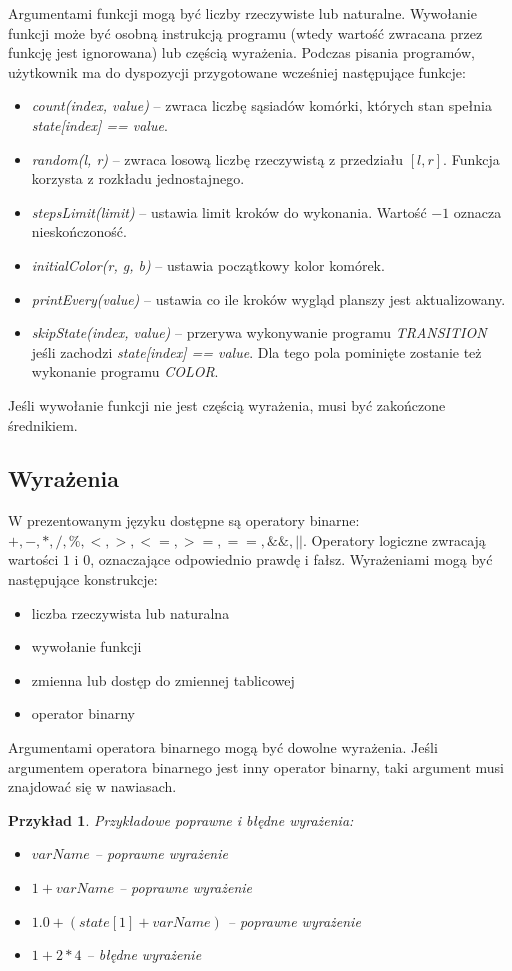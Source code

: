 \documentclass[declaration,shortabstract, inz]{iithesis}
\theoremstyle{definition} \newtheorem{definition}{Definicja}[]
\theoremstyle{plain} \newtheorem{remark}[definition]{Obserwacja}
\theoremstyle{plain} \newtheorem{theorem}[definition]{Twierdzenie}
\theoremstyle{plain} \newtheorem{example}{Przykład}[definition]
\theoremstyle{plain} \newtheorem{lemma}[definition]{Lemat}
\begin{document}
Argumentami funkcji mogą być liczby rzeczywiste lub naturalne. Wywołanie funkcji może być osobną instrukcją programu (wtedy wartość zwracana przez funkcję jest ignorowana) lub częścią wyrażenia.
Podczas pisania programów, użytkownik ma do dyspozycji przygotowane wcześniej następujące funkcje:
\begin{itemize}
\item \textit{count(index, value)} -- zwraca liczbę sąsiadów komórki, których stan spełnia \textit{state[index] == value}.
\item \textit{random(l, r)} -- zwraca losową liczbę rzeczywistą z przedziału $[l, r]$. Funkcja korzysta z rozkładu jednostajnego.
\item \textit{stepsLimit(limit)} -- ustawia limit kroków do wykonania. Wartość $-1$ oznacza nieskończoność.
\item \textit{initialColor(r, g, b)} -- ustawia początkowy kolor komórek.
\item \textit{printEvery(value)} -- ustawia co ile kroków wygląd planszy jest aktualizowany.
\item \textit{skipState(index, value)} -- przerywa wykonywanie programu \textit{TRANSITION} jeśli zachodzi \textit{state[index] == value}. Dla tego pola pominięte zostanie też wykonanie programu \textit{COLOR}.
\end{itemize}

Jeśli wywołanie funkcji nie jest częścią wyrażenia, musi być zakończone średnikiem.

\subsection{Wyrażenia}
W prezentowanym języku dostępne są operatory binarne: $+, -, * , /, \%, <, >, <=, >=, ==, \&\&, ||$.
Operatory logiczne zwracają wartości $1$ i $0$, oznaczające odpowiednio prawdę i fałsz.
Wyrażeniami mogą być następujące konstrukcje:
\begin{itemize}
\item liczba rzeczywista lub naturalna
\item wywołanie funkcji
\item zmienna lub dostęp do zmiennej tablicowej
\item operator binarny
\end{itemize}
Argumentami operatora binarnego mogą być dowolne wyrażenia. Jeśli argumentem operatora binarnego jest inny operator binarny, taki argument musi znajdować się w nawiasach.

\begin{example}
Przykładowe poprawne i błędne wyrażenia:
\begin{itemize}
\item $varName$ -- poprawne wyrażenie 
\item $1 + varName$ -- poprawne wyrażenie
\item $1.0 + (state[1] + varName)$ -- poprawne wyrażenie
\item $1 + 2 * 4$ -- błędne wyrażenie
\end{itemize}
\end{example}
\end{document}
